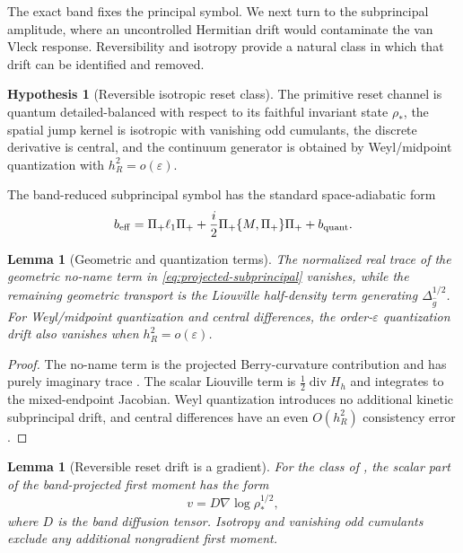 \documentclass[11pt]{article}
\newtheorem{lemma}[theorem]{Lemma}
\theoremstyle{definition}
\newtheorem{hypothesis}[theorem]{Hypothesis}
\theoremstyle{remark}
\newcommand{\eps}{\varepsilon}
\newcommand{\wideg}{\widehat g}
\newcommand{\rstar}{\rho_*}
\DeclareMathOperator{\dive}{div}
\begin{document}
The exact band fixes the principal symbol. We next turn to the subprincipal
amplitude, where an uncontrolled Hermitian drift would contaminate the van
Vleck response. Reversibility and isotropy provide a natural class in which
that drift can be identified and removed.

\begin{hypothesis}[Reversible isotropic reset class]
\label{hyp:reversible-isotropic}
The primitive reset channel is quantum detailed-balanced with respect to its
faithful invariant state $\rstar$, the spatial jump kernel is isotropic with
vanishing odd cumulants, the discrete derivative is central, and the continuum
generator is obtained by Weyl/midpoint quantization with $h_R^2=o(\eps)$.
\end{hypothesis}

The band-reduced subprincipal symbol has the standard space-adiabatic form
\begin{equation}
 b_{\rm eff}=\Pi_+\ell_1\Pi_+
 +\frac{i}{2}\Pi_+\{M,\Pi_+\}\Pi_+ + b_{\rm quant}.
 \label{eq:projected-subprincipal}
\end{equation}

\begin{lemma}[Geometric and quantization terms]
\label{lem:projected-geo-quant}
The normalized real trace of the geometric no-name term in
\eqref{eq:projected-subprincipal} vanishes, while the remaining geometric
transport is the Liouville half-density term generating
$\Delta_{\wideg}^{1/2}$.  For Weyl/midpoint quantization and central
differences, the order-$\eps$ quantization drift also vanishes when
$h_R^2=o(\eps)$.
\end{lemma}

\begin{proof}
The no-name term is the projected Berry-curvature contribution and has purely
imaginary trace \cite{LittlejohnFlynn,EmmrichWeinstein,PST}.  The scalar
Liouville term is $\tfrac12\dive H_h$ and integrates to the mixed-endpoint
Jacobian.  Weyl quantization introduces no additional kinetic subprincipal drift,
and central differences have an even $O(h_R^2)$ consistency error
\cite{DimassiSjostrand,HormanderIII}.
\end{proof}

\begin{lemma}[Reversible reset drift is a gradient]
\label{lem:gradient-reset-drift}
For the class of , the scalar part of the
band-projected first moment has the form
\[
 v=D\nabla\log\rstar^{1/2},
\]
where $D$ is the band diffusion tensor.  Isotropy and vanishing odd cumulants
exclude any additional nongradient first moment.
\end{lemma}
\end{document}
